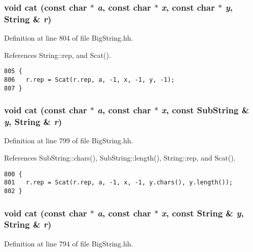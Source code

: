 \subsubsection{\setlength{\rightskip}{0pt plus 5cm}void cat (const char $\ast$ {\em a}, const char $\ast$ {\em x}, const char $\ast$ {\em y}, {\bf String} \& {\em r})\hspace{0.3cm}{\tt  [inline]}}\label{BigString_8hh_a68}




Definition at line 804 of file Big\-String.hh.

References String::rep, and Scat().



\footnotesize\begin{verbatim}805 {
806   r.rep = Scat(r.rep, a, -1, x, -1, y, -1);
807 }
\end{verbatim}\normalsize 
{}
\subsubsection{\setlength{\rightskip}{0pt plus 5cm}void cat (const char $\ast$ {\em a}, const char $\ast$ {\em x}, const {\bf Sub\-String} \& {\em y}, {\bf String} \& {\em r})\hspace{0.3cm}{\tt  [inline]}}\label{BigString_8hh_a67}




Definition at line 799 of file Big\-String.hh.

References Sub\-String::chars(), Sub\-String::length(), String::rep, and Scat().



\footnotesize\begin{verbatim}800 {
801   r.rep = Scat(r.rep, a, -1, x, -1, y.chars(), y.length());
802 }
\end{verbatim}\normalsize 
{}
\subsubsection{\setlength{\rightskip}{0pt plus 5cm}void cat (const char $\ast$ {\em a}, const char $\ast$ {\em x}, const {\bf String} \& {\em y}, {\bf String} \& {\em r})\hspace{0.3cm}{\tt  [inline]}}\label{BigString_8hh_a66}




Definition at line 794 of file Big\-String.hh.

